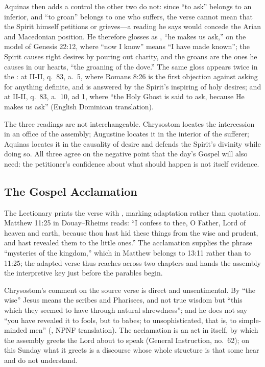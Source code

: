 Aquinas then adds a control the other two do not: since ``to ask'' belongs to
an inferior, and ``to groan'' belongs to one who suffers, the verse cannot mean
that the Spirit himself petitions or grieves---a reading he says would concede
the Arian and Macedonian position. He therefore glosses  as
, ``he makes us ask,'' on the model of Genesis
22:12, where ``now I know'' means ``I have made known''; the Spirit causes
right desires by pouring out charity, and the groans are the ones he causes in
our hearts, ``the groaning of the dove.'' The same gloss appears twice in the
: at II-II, q.\ 83, a.\ 5, where Romans 8:26 is the
first objection against asking for anything definite, and is answered by the
Spirit's inspiring of holy desires; and at II-II, q.\ 83, a.\ 10, ad 1, where
``the Holy Ghost is said to ask, because He makes us ask'' (English Dominican
translation).

The three readings are not interchangeable. Chrysostom locates the
intercession in an office of the assembly; Augustine locates it in the interior
of the sufferer; Aquinas locates it in the causality of desire and defends the
Spirit's divinity while doing so. All three agree on the negative point that
the day's Gospel will also need: the petitioner's confidence about what should
happen is not itself evidence.

\subsection*{The Gospel Acclamation}

The Lectionary prints the verse with , marking adaptation rather
than quotation. Matthew 11:25 in Douay--Rheims reads: ``I confess to thee, O
Father, Lord of heaven and earth, because thou hast hid these things from the
wise and prudent, and hast revealed them to the little ones.'' The acclamation
supplies the phrase ``mysteries of the kingdom,'' which in Matthew belongs to
13:11 rather than to 11:25; the adapted verse thus reaches across two chapters
and hands the assembly the interpretive key just before the parables begin.

Chrysostom's comment on the source verse is direct and unsentimental. By
``the wise'' Jesus means the scribes and Pharisees, and not true wisdom but
``this which they seemed to have through natural shrewdness''; and he does not
say ``you have revealed it to fools, but to babes; to unsophisticated, that
is, to simple-minded men'' (, NPNF translation).
The acclamation is an act in itself, by which the assembly greets the Lord
about to speak (General Instruction, no.\ 62); on this Sunday what it greets is
a discourse whose whole structure is that some hear and do not understand.

